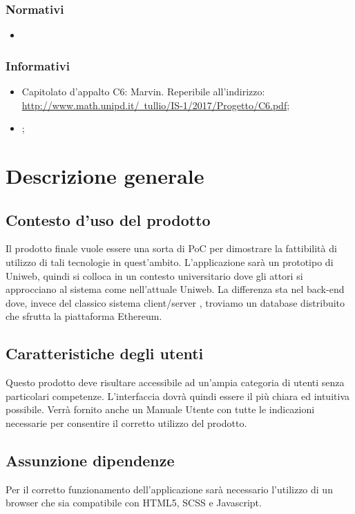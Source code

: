\subsubsection{Normativi}
\begin{itemize}
	\item \textcolor{red}\NdP
\end{itemize}

\subsubsection{Informativi}
\begin{itemize}
	\item Capitolato d'appalto C6: Marvin. Reperibile all'indirizzo:\\ 
	\href{http://www.math.unipd.it/~tullio/IS-1/2017/Progetto/C6.pdf}{http://www.math.unipd.it/~tullio/IS-1/2017/Progetto/C6.pdf};
	\item \textcolor{red}\SdF;
\end{itemize}

\section{Descrizione generale}
	\subsection{Contesto d'uso del prodotto}
	Il prodotto finale vuole essere una sorta di PoC per dimostrare la fattibilità di utilizzo di tali tecnologie in
	quest’ambito. L’applicazione sarà un prototipo di Uniweb, quindi si colloca in un contesto universitario dove
	gli attori si approcciano al sistema come nell’attuale Uniweb. La differenza sta nel back-end dove, invece
	del classico sistema client/server , troviamo un database distribuito che sfrutta la piattaforma Ethereum.
	
	\subsection{Caratteristiche degli utenti}
	Questo prodotto deve risultare accessibile ad un'ampia categoria di utenti senza particolari competenze. L’interfaccia dovrà quindi essere il più chiara ed intuitiva possibile. Verrà fornito anche un Manuale Utente con tutte le indicazioni necessarie per consentire il corretto utilizzo del prodotto.
	
	\subsection{Assunzione dipendenze}
	Per il corretto funzionamento dell’applicazione sarà necessario l’utilizzo di un browser che sia compatibile con HTML5, SCSS e Javascript.
